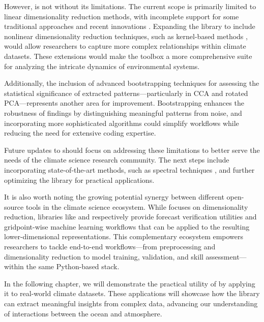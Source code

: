 However,  is not without its limitations. The current scope is primarily limited to linear dimensionality reduction methods, with incomplete support for some traditional approaches and recent innovations \cite[e.g.][]{guilloteau_rotated_2020,shen_sparse_2008,guerra-urzola_guide_2021}. Expanding the library to include nonlinear dimensionality reduction techniques, such as kernel-based methods \cite{scholkopf_nonlinear_1998,bueso_nonlinear_2020}, would allow researchers to capture more complex relationships within climate datasets. These extensions would make the toolbox a more comprehensive suite for analyzing the intricate dynamics of environmental systems.

Additionally, the inclusion of advanced bootstrapping techniques for assessing the statistical significance of extracted patterns---particularly in CCA and rotated PCA---represents another area for improvement. Bootstrapping enhances the robustness of findings by distinguishing meaningful patterns from noise, and incorporating more sophisticated algorithms \cite[e.g][]{timmerman_estimating_2007,winkler_permutation_2020} could simplify workflows while reducing the need for extensive coding expertise.

Future updates to  should focus on addressing these limitations to better serve the needs of the climate science research community. The next steps include incorporating state-of-the-art methods, such as spectral techniques \cite{guilloteau_rotated_2020}, and further optimizing the library for practical applications.

It is also worth noting the growing potential synergy between different open-source tools in the climate science ecosystem. While  focuses on dimensionality reduction, libraries like  \cite{brady_climpred_2021} and  \cite{hall_xcast_2022} respectively provide forecast verification utilities and gridpoint-wise machine learning workflows that can be applied to the resulting lower-dimensional representations. This complementary ecosystem empowers researchers to tackle end-to-end workflows---from preprocessing and dimensionality reduction to model training, validation, and skill assessment---within the same Python-based stack.

In the following chapter, we will demonstrate the practical utility of  by applying it to real-world climate datasets. These applications will showcase how the library can extract meaningful insights from complex data, advancing our understanding of interactions between the ocean and atmosphere.
